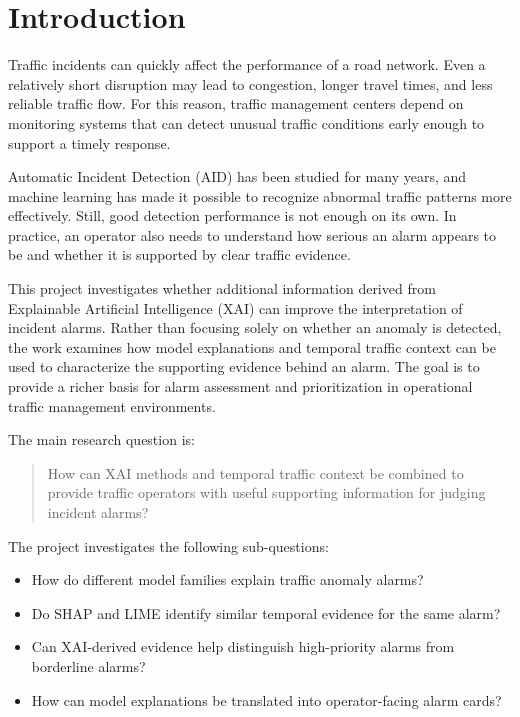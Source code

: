 \documentclass[10pt,a4paper]{article}
\begin{document}
	\newpage
	
	\section{Introduction}
	
	Traffic incidents can quickly affect the performance of a road network. Even a relatively short disruption may lead to congestion, longer travel times, and less reliable traffic flow. For this reason, traffic management centers depend on monitoring systems that can detect unusual traffic conditions early enough to support a timely response.
	
	Automatic Incident Detection (AID) has been studied for many years, and machine learning has made it possible to recognize abnormal traffic patterns more effectively. Still, good detection performance is not enough on its own. In practice, an operator also needs to understand how serious an alarm appears to be and whether it is supported by clear traffic evidence.
	
	This project investigates whether additional information derived from Explainable Artificial Intelligence (XAI) can improve the interpretation of incident alarms. Rather than focusing solely on whether an anomaly is detected, the work examines how model explanations and temporal traffic context can be used to characterize the supporting evidence behind an alarm. The goal is to provide a richer basis for alarm assessment and prioritization in operational traffic management environments.
	
	The main research question is:
	
	\begin{quote}
		How can XAI methods and temporal traffic context be combined to provide traffic operators with useful supporting information for judging incident alarms?
	\end{quote}
	
	The project investigates the following sub-questions:
	
	\begin{itemize}
		\item How do different model families explain traffic anomaly alarms?
		\item Do SHAP and LIME identify similar temporal evidence for the same alarm?
		\item Can XAI-derived evidence help distinguish high-priority alarms from borderline alarms?
		\item How can model explanations be translated into operator-facing alarm cards?
	\end{itemize}
	
\end{document}
